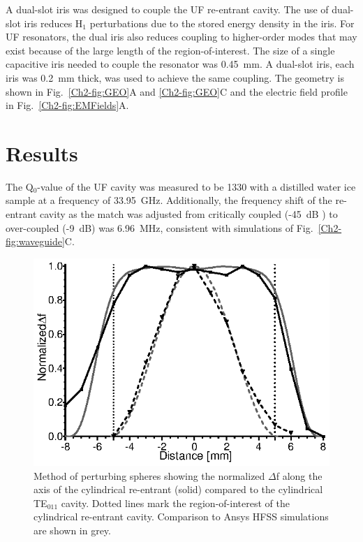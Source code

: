 A dual-slot iris was designed to couple the UF re-entrant \cylTE{} cavity. The use of dual-slot iris reduces H$_1$ perturbations due to the stored energy density in the iris. For UF resonators, the dual iris also reduces coupling to higher-order modes that may exist because of the large length of the region-of-interest. \cite{UFLGR2017} The size of a single capacitive iris needed to couple the resonator was 0.45~mm. A dual-slot iris, each iris was 0.2~mm thick, was used to achieve the same coupling. The geometry is shown in Fig.~\ref{Ch2-fig:GEO}A and \ref{Ch2-fig:GEO}C and the electric field profile in Fig.~\ref{Ch2-fig:EMFields}A.

\section{Results}
The Q$_0$-value of the UF cavity was measured to be 1330 with a distilled water ice sample at a frequency of 33.95~GHz. Additionally, the frequency shift of the re-entrant \cylTE{} cavity as the match was adjusted from critically coupled (-45~dB ) to over-coupled (-9~dB) was 6.96~MHz, consistent with simulations of Fig.~\ref{Ch2-fig:waveguide}C. 

\begin{figure}[htb]\centering
 \includegraphics{Kapitel/Ch2-Images/05-TE01Uperturb.eps}
 \caption[Measured magnetic field using perturbing spheres.]{Method of perturbing spheres showing the normalized $\Delta$f along the axis of the cylindrical re-entrant \cylTE{} (solid) compared to the cylindrical TE$_{\text{011}}$ cavity. Dotted lines mark the region-of-interest of the cylindrical re-entrant \cylTE{} cavity.  Comparison to Ansys HFSS simulations are shown in grey.}
 \label{Ch2-fig:perturb}
\end{figure}


